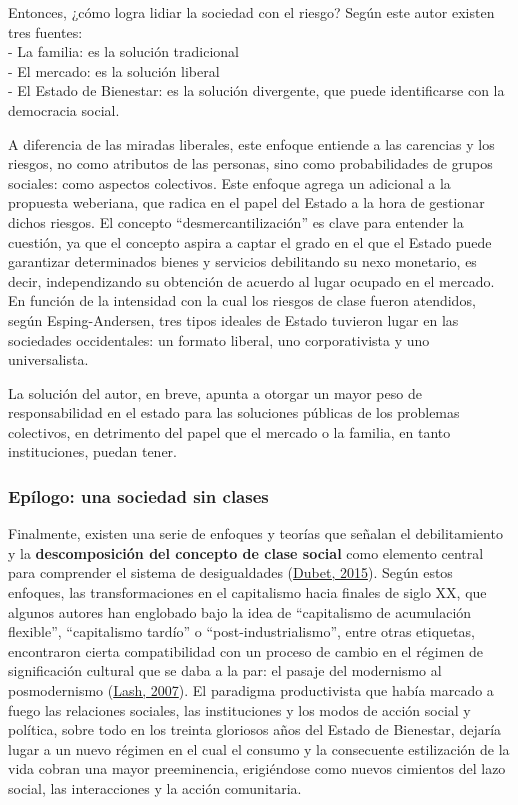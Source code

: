 \documentclass[
]{article}
\begin{document}
Entonces, ¿cómo logra lidiar la sociedad con el riesgo? Según este autor existen tres fuentes:\\
- La familia: es la solución tradicional\\
- El mercado: es la solución liberal\\
- El Estado de Bienestar: es la solución divergente, que puede identificarse con la democracia social.

A diferencia de las miradas liberales, este enfoque entiende a las carencias y los riesgos, no como atributos de las personas, sino como probabilidades de grupos sociales: como aspectos colectivos. Este enfoque agrega un adicional a la propuesta weberiana, que radica en el papel del Estado a la hora de gestionar dichos riesgos. El concepto ``desmercantilización'' es clave para entender la cuestión, ya que el concepto aspira a captar el grado en el que el Estado puede garantizar determinados bienes y servicios debilitando su nexo monetario, es decir, independizando su obtención de acuerdo al lugar ocupado en el mercado. En función de la intensidad con la cual los riesgos de clase fueron atendidos, según Esping-Andersen, tres tipos ideales de Estado tuvieron lugar en las sociedades occidentales: un formato liberal, uno corporativista y uno universalista.

La solución del autor, en breve, apunta a otorgar un mayor peso de responsabilidad en el estado para las soluciones públicas de los problemas colectivos, en detrimento del papel que el mercado o la familia, en tanto instituciones, puedan tener.

\hypertarget{epuxedlogo-una-sociedad-sin-clases}{%
\subsubsection{Epílogo: una sociedad sin clases}\label{epuxedlogo-una-sociedad-sin-clases}}

Finalmente, existen una serie de enfoques y teorías que señalan el debilitamiento y la \textbf{descomposición del concepto de clase social} como elemento central para comprender el sistema de desigualdades (\protect\hyperlink{ref-Dubet2015}{Dubet, 2015}). Según estos enfoques, las transformaciones en el capitalismo hacia finales de siglo XX, que algunos autores han englobado bajo la idea de ``capitalismo de acumulación flexible'', ``capitalismo tardío'' o ``post-industrialismo'', entre otras etiquetas, encontraron cierta compatibilidad con un proceso de cambio en el régimen de significación cultural que se daba a la par: el pasaje del modernismo al posmodernismo (\protect\hyperlink{ref-Lash2007}{Lash, 2007}). El paradigma productivista que había marcado a fuego las relaciones sociales, las instituciones y los modos de acción social y política, sobre todo en los treinta gloriosos años del Estado de Bienestar, dejaría lugar a un nuevo régimen en el cual el consumo y la consecuente estilización de la vida cobran una mayor preeminencia, erigiéndose como nuevos cimientos del lazo social, las interacciones y la acción comunitaria.
\end{document}
